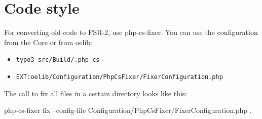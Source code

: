 \section{Code style}

For converting old code to PSR-2, use php-cs-fixer. You can use the configuration from the Core or from oelib:

\begin{itemize}
  \item \texttt{typo3\_src/Build/.php\_cs}
  \item \texttt{EXT:oelib/Configuration/PhpCsFixer/FixerConfiguration.php}
\end{itemize}

The call to fix all files in a certain directory looks like this:

\begin{textcode}
php-cs-fixer fix --config-file Configuration/PhpCsFixer/FixerConfiguration.php .
\end{textcode}
